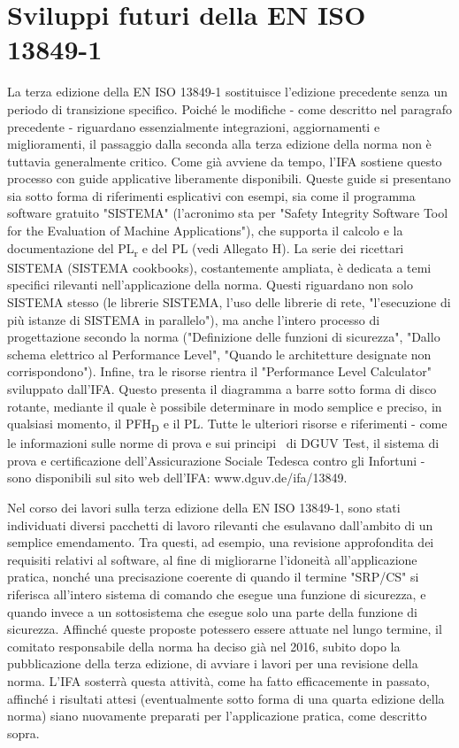 \section{Sviluppi futuri della EN ISO 13849-1}
\label{sec:04-5}
La terza edizione della EN ISO 13849-1 sostituisce l'edizione precedente senza un periodo di transizione specifico. Poiché le modifiche - come descritto nel paragrafo precedente - riguardano essenzialmente integrazioni, aggiornamenti e miglioramenti, il passaggio dalla seconda alla terza edizione della norma non è tuttavia generalmente critico. Come già avviene da tempo, l'IFA sostiene questo processo con guide applicative liberamente disponibili. Queste guide si presentano sia sotto forma di riferimenti esplicativi con esempi, sia come il programma software gratuito "SISTEMA" (l'acronimo sta per "Safety Integrity Software Tool for the Evaluation of Machine Applications"), che supporta il calcolo e la documentazione del PL\textsubscript{\small r} e del PL (vedi Allegato H). La serie dei ricettari SISTEMA (SISTEMA cookbooks), costantemente ampliata, è dedicata a temi specifici rilevanti nell'applicazione della norma. Questi riguardano non solo SISTEMA stesso (le librerie SISTEMA, l'uso delle librerie di rete, "l'esecuzione di più istanze di SISTEMA in parallelo"), ma anche l'intero processo di progettazione secondo la norma ("Definizione delle funzioni di sicurezza", "Dallo schema elettrico al Performance Level", "Quando le architetture designate non corrispondono"). Infine, tra le risorse rientra il "Performance Level Calculator"~\cite{schaefer2015plc} sviluppato dall'IFA. Questo presenta il diagramma a barre sotto forma di disco rotante, mediante il quale è possibile determinare in modo semplice e preciso, in qualsiasi momento, il PFH\textsubscript{D} e il PL. Tutte le ulteriori risorse e riferimenti - come le informazioni sulle norme di prova e sui principi~\cite{dguvtest} di DGUV Test, il sistema di prova e certificazione dell'Assicurazione Sociale Tedesca contro gli Infortuni - sono disponibili sul sito web dell'IFA: www.dguv.de/ifa/13849.

Nel corso dei lavori sulla terza edizione della EN ISO 13849-1, sono stati individuati diversi pacchetti di lavoro rilevanti che esulavano dall'ambito di un semplice emendamento. Tra questi, ad esempio, una revisione approfondita dei requisiti relativi al software, al fine di migliorarne l'idoneità all'applicazione pratica, nonché una precisazione coerente di quando il termine "SRP/CS" si riferisca all'intero sistema di comando che esegue una funzione di sicurezza, e quando invece a un sottosistema che esegue solo una parte della funzione di sicurezza. Affinché queste proposte potessero essere attuate nel lungo termine, il comitato responsabile della norma ha deciso già nel 2016, subito dopo la pubblicazione della terza edizione, di avviare i lavori per una revisione della norma. L'IFA sosterrà questa attività, come ha fatto efficacemente in passato, affinché i risultati attesi (eventualmente sotto forma di una quarta edizione della norma) siano nuovamente preparati per l'applicazione pratica, come descritto sopra.

